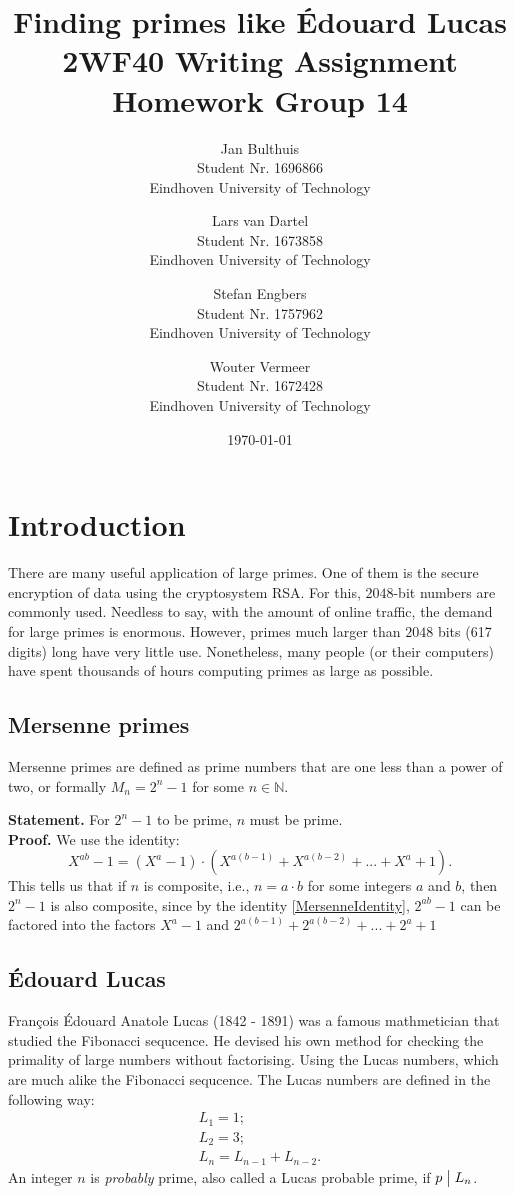 \documentclass[12pt]{article}
\title{
    Finding primes like Édouard Lucas \\
    \large{2WF40 Writing Assignment Homework Group 14}
}
\author{Jan Bulthuis \\ 
        \small{Student Nr. 1696866} \\
        \small{Eindhoven University of Technology} \\
        \and
        Lars van Dartel \\
        \small{Student Nr. 1673858} \\
        \small{Eindhoven University of Technology} \\
        \and
        Stefan Engbers \\ 
        \small{Student Nr. 1757962}\\
        \small{Eindhoven University of Technology} \\
        \and
        Wouter Vermeer \\
        \small{Student Nr. 1672428} \\
        \small{Eindhoven University of Technology}
        }
\date{\today}
\newcommand{\N}{\mathbb{N}}
\begin{document}
\maketitle
\tableofcontents

\newpage
\setcounter{page}{1}
\section{Introduction}
There are many useful application of large primes. One of them is the secure encryption of data using the cryptosystem RSA. For this, $2048$-bit numbers are commonly used. Needless to say, with the amount of online traffic, the demand for large primes is enormous. However, primes much larger than $2048$ bits (617 digits) long have very little use. Nonetheless, many people (or their computers) have spent thousands of hours computing primes as large as possible.

\subsection{Mersenne primes}
Mersenne primes are defined as prime numbers that are one less than a power of two, or formally $M_n = 2^n - 1$ for some $n \in \N$.

\textbf{Statement.} For $2^n - 1$ to be prime, $n$ must be prime. \\
\textbf{Proof.} We use the identity:
\begin{equation}\label{MersenneIdentity}
    X^{ab}-1 = \left( X^a - 1 \right) \cdot \left( X^{a(b-1)} + X^{a(b-2)} + ... + X^a + 1 \right).
\end{equation}
This tells us that if $n$ is composite, i.e., $n = a \cdot b$ for some integers $a$ and $b$, then $2^n-1$ is also composite, since by the identity \eqref{MersenneIdentity}, $2^{ab}-1$ can be factored into the factors $X^a - 1$ and $2^{a(b-1)} + 2^{a(b-2)} + ... + 2^a + 1$

\subsection{Édouard Lucas}
François Édouard Anatole Lucas (1842 - 1891) was a famous mathmetician that studied the Fibonacci sequcence. He devised his own method for checking the primality of large numbers without factorising. Using the Lucas numbers, which are much alike the Fibonacci sequcence. The Lucas numbers are defined in the following way:
\begin{eqnarray*}
    L_1 = 1; \\
    L_2 = 3; \\
    L_n = L_{n-1} + L_{n-2}.
\end{eqnarray*}
An integer $n$ is \textit{probably} prime, also called a Lucas probable prime, if $p \bigm| L_n$. 
\end{document}
